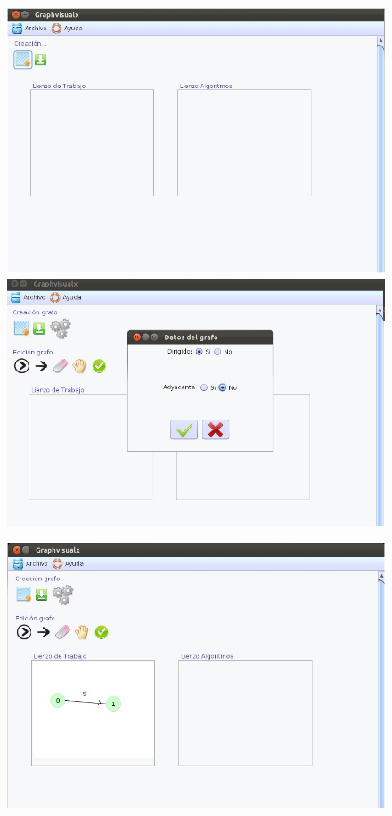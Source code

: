 \begin{itemize}
\begin{figure}[H]
\begin{center}
\includegraphics[width=14cm]{./imagenes_documentacion/Graphvisualx_31_1_2012/captura_1.jpeg}
\includegraphics[width=14cm]{./imagenes_documentacion/Graphvisualx_31_1_2012/captura_2.jpeg}
\end{center}
\end{figure} 
\newpage
\begin{figure}[H]
\begin{center}
\includegraphics[width=14cm]{./imagenes_documentacion/Graphvisualx_31_1_2012/captura_3.jpeg}

\end{center}
\end{figure}
\end{itemize}
